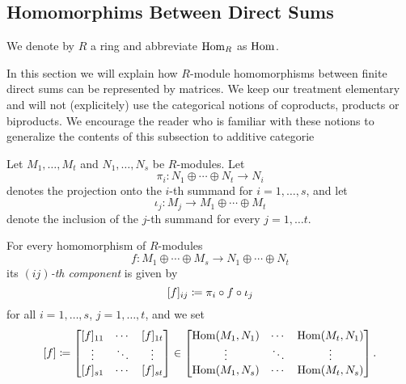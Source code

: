 \subsection{Homomorphims Between Direct Sums}


\begin{conventions}
  We denote by $R$ a ring and abbreviate $\operatorname{Hom}_R$ as $\operatorname{Hom}$.
\end{conventions}


\begin{fluff}
  In this section we will explain how $R$-module homomorphisms between finite direct sums can be represented  by matrices.
  We keep our treatment elementary and will not (explicitely) use the categorical notions of coproducts, products or biproducts.
  We encourage the reader who is familiar with these notions to generalize the contents of this subsection to additive categorie
\end{fluff}


\begin{fluff}
  Let $M_1, \dotsc, M_t$ and $N_1, \dotsc, N_s$ be $R$-modules.
  Let
  \[
          \pi_i
  \colon  N_1 \oplus \dotsb \oplus N_t
  \to     N_i
  \]
  denotes the projection onto the $i$-th summand for $i = 1, \dotsc, s$, and let
  \[
            \iota_j
    \colon  M_j
    \to     M_1 \oplus \dotsb \oplus M_t
  \]
  denote the inclusion of the $j$-th summand for every $j = 1, \dotsc t$.
\end{fluff}


\begin{definition}
  For every homomorphism of $R$-modules
  \[
            f
    \colon  M_1 \oplus \dotsb \oplus M_s
    \to     N_1 \oplus \dotsb \oplus N_t
  \]
  its \emph{$(ij)$-th component} is given by
  \[
              [f]_{ij}
    \coloneqq  \pi_i \circ f \circ \iota_j
  \]
  for all $i = 1, \dotsc, s$, $j = 1, \dotsc, t$, and we set
  \[
              [f]
    \coloneqq  \begin{bmatrix}
                [f]_{11}  & \cdots  & [f]_{1t}  \\
                \vdots    & \ddots  & \vdots    \\
                [f]_{s1}  & \cdots  & [f]_{st}
              \end{bmatrix}
    \in       \begin{bmatrix}
                \operatorname{Hom}(M_1, N_1)  & \cdots  & \operatorname{Hom}(M_t, N_1)  \\
                \vdots          & \ddots  & \vdots          \\
                \operatorname{Hom}(M_1, N_s)  & \cdots  & \operatorname{Hom}(M_t, N_s)
              \end{bmatrix}.
  \]
\end{definition}


